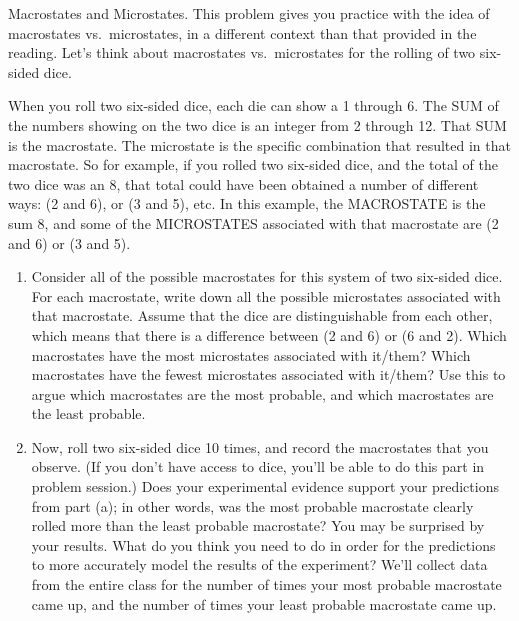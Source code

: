 \begin{aproblem}{Macrostates and Microstates.} 
  This problem gives you practice with the idea of macrostates vs.\
  microstates, in a different context than that provided in the
  reading.  Let's think about macrostates vs.\ microstates for the
  rolling of two six-sided dice. 
 
  When you roll two six-sided dice, each die can show a 1 through 6.
  The SUM of the numbers showing on the two dice is an integer from 2
  through 12.  That SUM is the macrostate.  The microstate is the
  specific combination that resulted in that macrostate.  So for
  example, if you rolled two six-sided dice, and the total of the two
  dice was an 8, that total could have been obtained a number of
  different ways: (2 and 6), or (3 and 5), etc.  In this example, the
  MACROSTATE is the sum 8, and some of the MICROSTATES associated with
  that macrostate are (2 and 6) or (3 and 5).

  \begin{enumerate}
  \item Consider all of the possible macrostates for this system of
    two six-sided dice.  For each macrostate, write down all the
    possible microstates associated with that macrostate.  Assume that
    the dice are distinguishable from each other, which means that
    there is a difference between (2 and 6) or (6 and 2).  Which
    macrostates have the most microstates associated with it/them?
    Which macrostates have the fewest microstates associated with
    it/them?  Use this to argue which macrostates are the most
    probable, and which macrostates are the least probable.

  \item Now, roll two six-sided dice 10 times, and record the
    macrostates that you observe. (If you don't have access to dice,
    you'll be able to do this part in problem session.)  Does your
    experimental evidence support your predictions from part (a); in
    other words, was the most probable macrostate clearly rolled more
    than the least probable macrostate?  You may be surprised by your
    results.  What do you think you need to do in order for the
    predictions to more accurately model the results of the
    experiment?  We'll collect data from the entire class for the
    number of times your most probable macrostate came up, and the
    number of times your least probable macrostate came up.

  \end{enumerate}
\end{aproblem}



